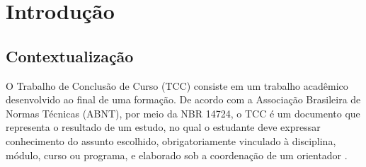 \chapter[Introdução]{Introdução}

\section{Contextualização}

O Trabalho de Conclusão de Curso (TCC) consiste em um trabalho acadêmico desenvolvido ao final de uma formação. De acordo com a Associação Brasileira de Normas Técnicas (ABNT), por meio da NBR 14724, o TCC é um documento que representa o resultado de um estudo, no qual o estudante deve expressar conhecimento do assunto escolhido, obrigatoriamente vinculado à disciplina, módulo, curso ou programa, e elaborado sob a coordenação de
um orientador \cite{ABNT2024}.




